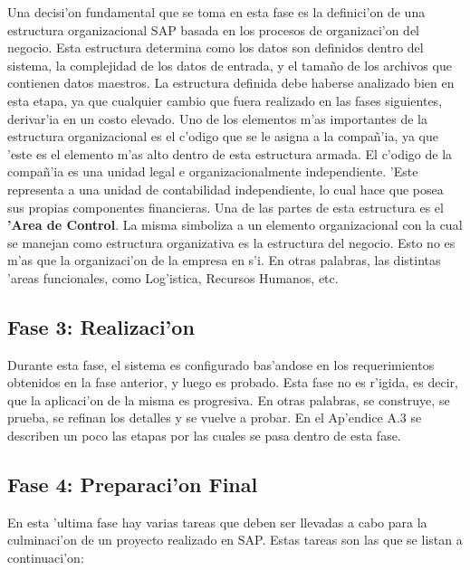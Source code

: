 \indent Una decisi'on fundamental que se toma en esta fase es la definici'on de una estructura organizacional SAP basada en los procesos de organizaci'on del negocio. 
\newline
\newline
\indent Esta estructura determina como los datos son definidos dentro del sistema, la complejidad de los datos de entrada, y el tama\~no de los archivos que contienen datos maestros. 
\newline
\newline
\indent La estructura definida debe haberse analizado bien en esta etapa, ya que cualquier cambio que fuera realizado en las fases siguientes, derivar'ia en un costo elevado.
\newline
\newline
\indent Uno de los elementos m'as importantes de la estructura organizacional es el c'odigo que se le asigna a la compa\~n'ia, ya que 'este es el elemento m'as alto dentro de esta estructura armada. El c'odigo de la compa\~n'ia es una unidad legal e organizacionalmente independiente. 'Este representa a una unidad de contabilidad independiente, lo cual hace que posea sus propias componentes financieras.
\newline
\newline
\indent Una de las partes de esta estructura es el \textbf{'Area de Control}. La misma simboliza a un elemento organizacional con la cual se manejan como estructura organizativa es la estructura del negocio. Esto no es m'as que la organizaci'on de la empresa en s'i. En otras palabras, las distintas 'areas funcionales, como Log'istica, Recursos Humanos, etc.
\subsection{Fase 3: Realizaci'on}
	Durante esta fase, el sistema es configurado bas'andose en los requerimientos obtenidos en la fase anterior, y luego es probado. Esta fase no es r'igida, es decir, que la aplicaci'on de la misma es progresiva. En otras palabras, se construye, se prueba, se refinan los detalles y se vuelve a probar. En el Ap'endice A.3 se describen un poco las etapas por las cuales se pasa dentro de esta fase.

\subsection{Fase 4: Preparaci'on Final}
	En esta 'ultima fase hay varias tareas que deben ser llevadas a cabo para la culminaci'on de un proyecto realizado en SAP. Estas tareas son las que se listan a continuaci'on:
	
